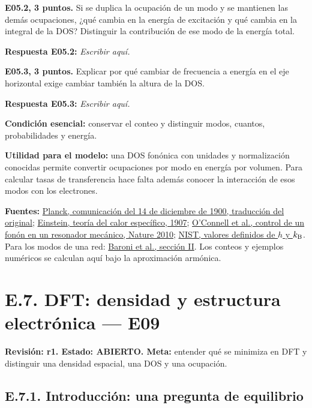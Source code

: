 \documentclass[
  spanish,
  10pt,
  a4paper,
]{article}
\begin{document}
\textbf{E05.2, 3 puntos.} Si se duplica la ocupación de un modo y se
mantienen las demás ocupaciones, ¿qué cambia en la energía de excitación
y qué cambia en la integral de la DOS? Distinguir la contribución de ese
modo de la energía total.

\textbf{Respuesta E05.2:} \emph{Escribir aquí.}


\textbf{E05.3, 3 puntos.} Explicar por qué cambiar de frecuencia a
energía en el eje horizontal exige cambiar también la altura de la DOS.

\textbf{Respuesta E05.3:} \emph{Escribir aquí.}

\textbf{Condición esencial:} conservar el conteo y distinguir modos,
cuantos, probabilidades y energía.

\textbf{Utilidad para el modelo:} una DOS fonónica con unidades y
normalización conocidas permite convertir ocupaciones por modo en
energía por volumen. Para calcular tasas de transferencia hace falta
además conocer la interacción de esos modos con los electrones.

\textbf{Fuentes:}
\href{https://informationphilosopher.com/solutions/scientists/planck/Planck_1900b.pdf}{Planck,
comunicación del 14 de diciembre de 1900, traducción del original};
\href{https://onlinelibrary.wiley.com/doi/10.1002/andp.19063270110}{Einstein,
teoría del calor específico, 1907};
\href{https://www.nature.com/articles/nature08967}{O'Connell et al.,
control de un fonón en un resonador mecánico, Nature 2010};
\href{https://www.nist.gov/pml/special-publication-330/sp-330-section-2}{NIST,
valores definidos de \(h\) y \(k_{\rm B}\)}. Para los modos de una red:
\href{https://arxiv.org/abs/cond-mat/0012092}{Baroni et al., sección
II}. Los conteos y ejemplos numéricos se calculan aquí bajo la
aproximación armónica.


\bigskip

\section{E.7. DFT: densidad y estructura electrónica ---
E09}\label{e.7.-dft-densidad-y-estructura-electruxf3nica-e09}

\textbf{Revisión: r1. Estado: ABIERTO. Meta:} entender qué se minimiza
en DFT y distinguir una densidad espacial, una DOS y una ocupación.

\subsection{E.7.1. Introducción: una pregunta de
equilibrio}\label{e.7.1.-introducciuxf3n-una-pregunta-de-equilibrio}
\end{document}
